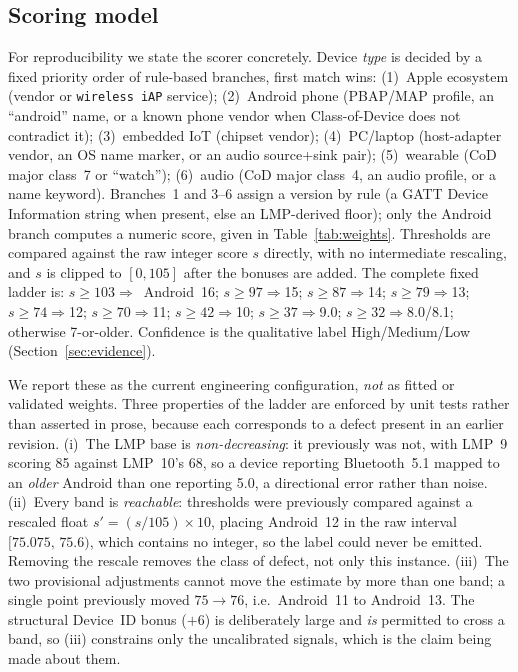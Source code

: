 \documentclass[conference]{IEEEtran}
\begin{document}
\subsection{Scoring model}\label{sec:scoring}
For reproducibility we state the scorer concretely. Device \emph{type} is
decided by a fixed priority order of rule-based branches, first match
wins: (1)~Apple ecosystem (vendor or \texttt{wireless iAP} service);
(2)~Android phone (PBAP/MAP profile, an ``android'' name, or a known
phone vendor when Class-of-Device does not contradict it); (3)~embedded
IoT (chipset vendor); (4)~PC/laptop (host-adapter vendor, an OS name
marker, or an audio source+sink pair); (5)~wearable (CoD major class~7
or ``watch''); (6)~audio (CoD major class~4, an audio profile, or a name
keyword). Branches~1 and 3--6 assign a version by rule (a GATT Device
Information string when present, else an LMP-derived floor); only the
Android branch computes a numeric score, given in Table~\ref{tab:weights}.
Thresholds are compared against the raw integer score $s$ directly,
with no intermediate rescaling, and $s$ is clipped to $[0,105]$ after the
bonuses are added. The complete fixed ladder is: $s\!\ge\!103\Rightarrow$~Android~16; $s\!\ge\!97\Rightarrow$15; $s\!\ge\!87\Rightarrow$14; $s\!\ge\!79\Rightarrow$13; $s\!\ge\!74\Rightarrow$12; $s\!\ge\!70\Rightarrow$11; $s\!\ge\!42\Rightarrow$10; $s\!\ge\!37\Rightarrow$9.0; $s\!\ge\!32\Rightarrow$8.0/8.1;
otherwise 7-or-older. Confidence is the qualitative label High/Medium/Low
(Section~\ref{sec:evidence}).

We report these as the current engineering configuration, \emph{not} as fitted
or validated weights. Three properties of the ladder are enforced by unit
tests rather than asserted in prose, because each corresponds to a defect
present in an earlier revision. (i)~The LMP base is \emph{non-decreasing}: it
previously was not, with LMP~9 scoring 85 against LMP~10's 68, so a device
reporting Bluetooth~5.1 mapped to an \emph{older} Android than one reporting
5.0, a directional error rather than noise. (ii)~Every band is
\emph{reachable}: thresholds were previously compared against a rescaled float
$s'=(s/105)\times10$, placing Android~12 in the raw interval
$[75.075,\,75.6)$, which contains no integer, so the label could never be
emitted. Removing the rescale removes the class of defect, not only this
instance. (iii)~The two provisional adjustments cannot move the estimate by
more than one band; a single point previously moved $75\to76$, i.e.\
Android~11 to Android~13. The structural Device~ID bonus ($+6$) is
deliberately large and \emph{is} permitted to cross a band, so (iii)
constrains only the uncalibrated signals, which is the claim being made about
them.
\end{document}
